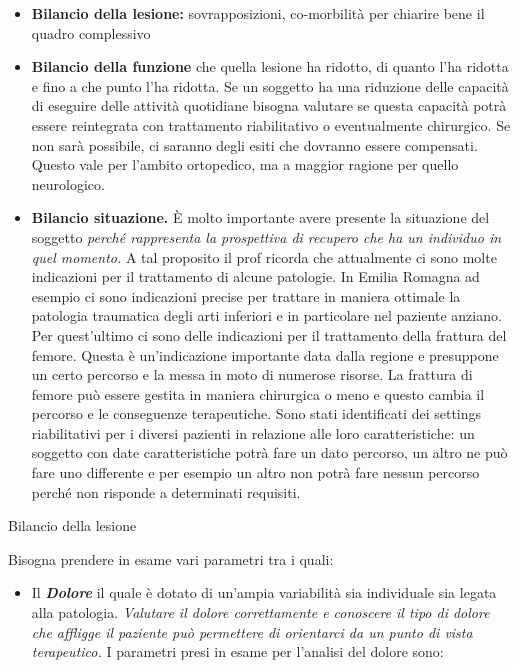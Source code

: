 \documentclass[]{article}
\begin{document}
\begin{itemize}
\item
  \textbf{Bilancio della lesione:} sovrapposizioni, co-morbilità per
  chiarire bene il quadro complessivo
\item
  \textbf{Bilancio della funzione} che quella lesione ha ridotto, di
  quanto l'ha ridotta e fino a che punto l'ha ridotta. Se un soggetto ha
  una riduzione delle capacità di eseguire delle attività quotidiane
  bisogna valutare se questa capacità potrà essere reintegrata con
  trattamento riabilitativo o eventualmente chirurgico. Se non sarà
  possibile, ci saranno degli esiti che dovranno essere compensati.
  Questo vale per l'ambito ortopedico, ma a maggior ragione per quello
  neurologico.
\item
  \textbf{Bilancio situazione.} È molto importante avere presente la
  situazione del soggetto \emph{perché rappresenta la prospettiva di
  recupero che ha un individuo in quel momento.} A tal proposito il prof
  ricorda che attualmente ci sono molte indicazioni per il trattamento
  di alcune patologie. In Emilia Romagna ad esempio ci sono indicazioni
  precise per trattare in maniera ottimale la patologia traumatica degli
  arti inferiori e in particolare nel paziente anziano. Per quest'ultimo
  ci sono delle indicazioni per il trattamento della frattura del
  femore. Questa è un'indicazione importante data dalla regione e
  presuppone un certo percorso e la messa in moto di numerose risorse.
  La frattura di femore può essere gestita in maniera chirurgica o meno
  e questo cambia il percorso e le conseguenze terapeutiche. Sono stati
  identificati dei settings riabilitativi per i diversi pazienti in
  relazione alle loro caratteristiche: un soggetto con date
  caratteristiche potrà fare un dato percorso, un altro ne può fare uno
  differente e per esempio un altro non potrà fare nessun percorso
  perché non risponde a determinati requisiti.
\end{itemize}

Bilancio della lesione

Bisogna prendere in esame vari parametri tra i quali:

\begin{itemize}
\item
  Il \textbf{\emph{Dolore}} il quale è dotato di un'ampia variabilità
  sia individuale sia legata alla patologia. \emph{Valutare il dolore
  correttamente e conoscere il tipo di dolore che affligge il paziente
  può permettere di orientarci da un punto di vista terapeutico.} I
  parametri presi in esame per l'analisi del dolore sono:
\end{itemize}
\end{document}
